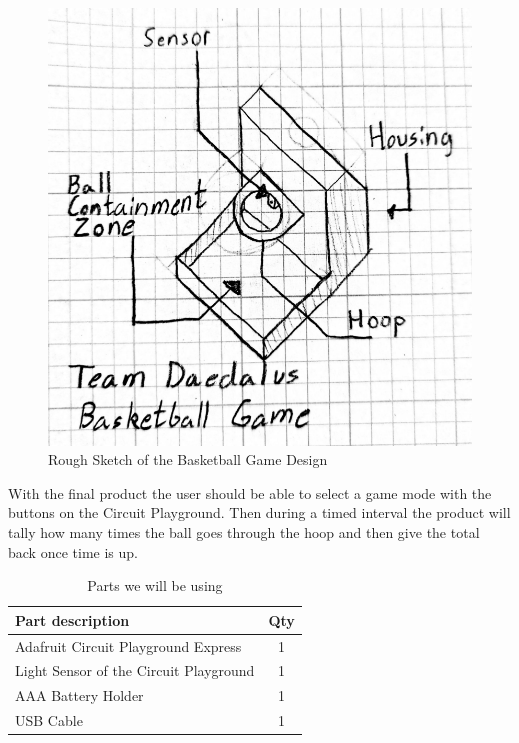 \documentclass[12pt]{article}
\begin{document}
\begin{figure}[!t]
\centering
\includegraphics[width=4.5in]{TeamDaedalusBasketballGame.png}
\caption{Rough Sketch of the Basketball Game Design}
\label{fig:cpx}
\end{figure}

\newpage
With the final product the user should be able to select a game mode with the buttons on the Circuit Playground. Then during a timed interval the product will tally how many times the ball goes through the hoop and then give the total back once time is up.

\begin{table}[ht]
  \caption{Parts we will be using}
  \label{table:parts_list}
  \begin{center}
  \begin{tabular}{|p{3in}|c|}
  
  \hline
  Part description & Qty\\
  \hline
  \hline
  Adafruit Circuit Playground Express & 1 \\
  \hline
  Light Sensor of the Circuit Playground & 1 \\
  \hline
  AAA Battery Holder & 1 \\
  \hline
  USB Cable & 1 \\
  \hline
  \end{tabular}
  \end{center}
  \end{table}
\end{document}
